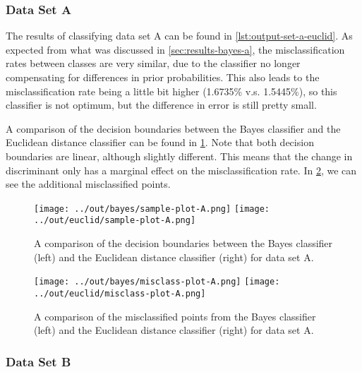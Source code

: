 \documentclass[headings=optiontoheadandtoc,listof=totoc,parskip=full]{scrartcl}
\begin{document}
\subsubsection{Data Set A}

The results of classifying data set A can be found in \cref{lst:output-set-a-euclid}. As expected from what was discussed in \cref{sec:results-bayes-a}, the misclassification rates between classes are very similar, due to the classifier no longer compensating for differences in prior probabilities. This also leads to the misclassification rate being a little bit higher (1.6735\% v.s. 1.5445\%), so this classifier is not optimum, but the difference in error is still pretty small.



A comparison of the decision boundaries between the Bayes classifier and the Euclidean distance classifier can be found in \cref{fig:sample-comparison-A}. Note that both decision boundaries are linear, although slightly different. This means that the change in discriminant only has a marginal effect on the misclassification rate. In \cref{fig:misclass-comparison-A}, we can see the additional misclassified points.

\begin{figure}[H]
	\centering
	\texttt{[image: ../out/bayes/sample-plot-A.png]}
	\texttt{[image: ../out/euclid/sample-plot-A.png]}
	\caption{A comparison of the decision boundaries between the Bayes classifier (left) and the Euclidean distance classifier (right) for data set A.}
	\label{fig:sample-comparison-A}
\end{figure}


\begin{figure}[H]
	\centering
	\texttt{[image: ../out/bayes/misclass-plot-A.png]}
	\texttt{[image: ../out/euclid/misclass-plot-A.png]}
	\caption{A comparison of the misclassified points from the Bayes classifier (left) and the Euclidean distance classifier (right) for data set A.}
	\label{fig:misclass-comparison-A}
\end{figure}

\subsubsection{Data Set B}
\end{document}
